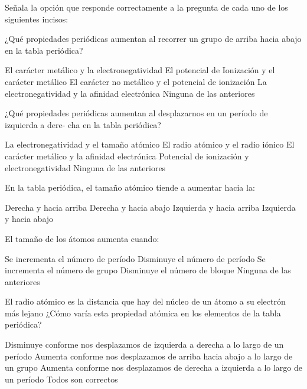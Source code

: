Señala la opción que responde correctamente a la pregunta de cada uno de los siguientes incisos:

\begin{multicols}{2}
    \begin{parts}
        ¿Qué propiedades periódicas aumentan al recorrer un grupo de arriba hacia abajo en la tabla
        periódica?
        \begin{choices}
            \CorrectChoice El carácter metálico y la electronegatividad
            \choice El potencial de Ionización y el carácter metálico
            \choice El carácter no metálico y el potencial de ionización
            \choice La electronegatividad y la afinidad electrónica
            \choice Ninguna de las anteriores
        \end{choices}

        ¿Qué propiedades periódicas aumentan al desplazarnos en un período de izquierda a dere-
        cha en la tabla periódica?
        \begin{choices}
            \CorrectChoice La electronegatividad y el tamaño atómico
            \choice El radio atómico y el radio iónico
            \choice El carácter metálico y la afinidad electrónica
            \choice Potencial de ionización y electronegatividad
            \choice Ninguna de las anteriores
        \end{choices}

        En la tabla periódica, el tamaño atómico tiende a aumentar hacia la:

        \begin{choices}
            \choice  Derecha y hacia arriba
            \CorrectChoice  Derecha y hacia abajo
            \choice  Izquierda y hacia arriba
            \choice  Izquierda y hacia abajo
        \end{choices}

        \columnbreak
        El tamaño de los átomos aumenta cuando:

        \begin{choices}
            \choice Se incrementa el número de período
            \choice  Disminuye el número de período
            \choice  Se incrementa el número de grupo
            \choice  Disminuye el número de bloque
            \choice  Ninguna de las anteriores
        \end{choices}

        El radio atómico es la distancia que hay del núcleo de un átomo a su electrón más lejano
        ¿Cómo varía esta propiedad atómica en los elementos de la tabla periódica?

        \begin{choices}
            \choice  Disminuye conforme nos desplazamos de izquierda a derecha a lo largo de un período
            \choice  Aumenta conforme nos desplazamos de arriba hacia abajo a lo largo de un grupo
            \choice  Aumenta conforme nos desplazamos de derecha a izquierda a lo largo de un período
            \choice  Todos son correctos
        \end{choices}

    \end{parts}
\end{multicols}
